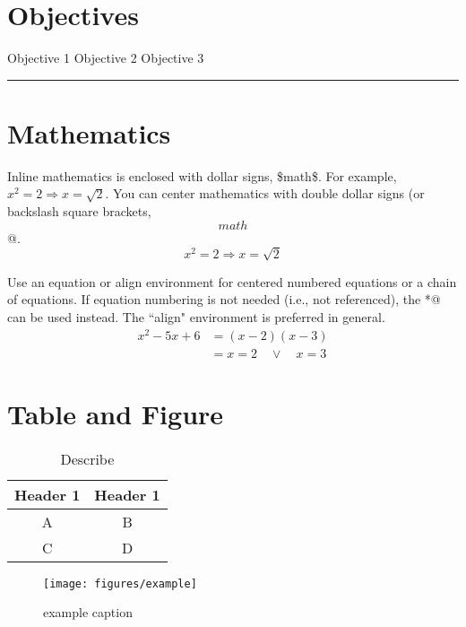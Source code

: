 
\section*{Objectives}
\begin{outline}
    \1 Objective 1
    \1 Objective 2
    \1 Objective 3
\end{outline}


\rule[0.0051in]{\textwidth}{0.00025in}


\section{Mathematics}
Inline mathematics is enclosed with dollar signs, \$math\$.  For example, $x^2 = 2 \Rightarrow x = \sqrt{2}$.  
You can center mathematics with double dollar signs (or backslash square brackets, \verb@\[ math \]@.
\[
x^2 = 2 \Rightarrow x = \sqrt{2}
\]

Use an equation or align environment for centered numbered equations or a chain of equations.
If equation numbering is not needed (i.e., not referenced), the \verb@align*@ can be used instead.
The ``align" environment is preferred in general. 
%
\begin{align}
x^2 - 5x + 6 	&= (x - 2)(x - 3) \\
		&= x = 2 \quad \lor \quad x = 3
\end{align}
%

\section{Table and Figure}

\begin{table}[h!]
    \centering
    \begin{tabular}{c c}
     \toprule
    Header 1 &   Header 1 \\
      \midrule
  	A & B\\
	C & D\\
	\bottomrule
    \end{tabular}
    \caption{Describe}
    \label{tab:abc}
\end{table}
%
%
\begin{figure}[htbp] %
   \centering
   \texttt{[image: figures/example]} 
   \caption{example caption}
   \label{fig:example}
\end{figure}

